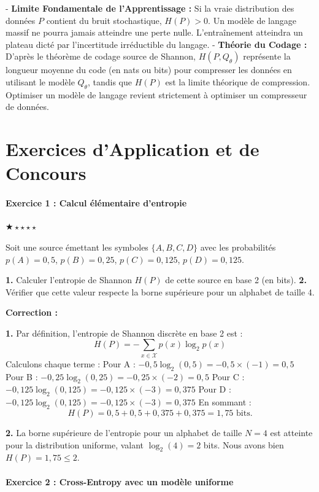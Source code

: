\documentclass[11pt,a4paper]{article}
\begin{document}
- \textbf{Limite Fondamentale de l'Apprentissage :} Si la vraie distribution des données $P$ contient du bruit stochastique, $H(P) > 0$. Un modèle de langage massif ne pourra jamais atteindre une perte nulle. L'entraînement atteindra un plateau dicté par l'incertitude irréductible du langage.
- \textbf{Théorie du Codage :} D'après le théorème de codage source de Shannon, $H(P, Q_\theta)$ représente la longueur moyenne du code (en nats ou bits) pour compresser les données en utilisant le modèle $Q_\theta$, tandis que $H(P)$ est la limite théorique de compression. Optimiser un modèle de langage revient strictement à optimiser un compresseur de données.



\newpage
\part{Exercices d'Application et de Concours}
\subsection*{Exercice 1 : Calcul élémentaire d'entropie }

$\bigstar\star\star\star\star$


Soit une source émettant les symboles $\{A, B, C, D\}$ avec les probabilités $p(A)=0,5$, $p(B)=0,25$, $p(C)=0,125$, $p(D)=0,125$.

\textbf{1.} Calculer l'entropie de Shannon $H(P)$ de cette source en base 2 (en bits).
\textbf{2.} Vérifier que cette valeur respecte la borne supérieure pour un alphabet de taille 4.

\textbf{Correction :}

\textbf{1.} Par définition, l'entropie de Shannon discrète en base 2 est :
$$H(P) = - \sum_{x \in \mathcal{X}} p(x) \log_2 p(x)$$
Calculons chaque terme :
Pour A : $-0,5 \log_2(0,5) = -0,5 \times (-1) = 0,5$
Pour B : $-0,25 \log_2(0,25) = -0,25 \times (-2) = 0,5$
Pour C : $-0,125 \log_2(0,125) = -0,125 \times (-3) = 0,375$
Pour D : $-0,125 \log_2(0,125) = -0,125 \times (-3) = 0,375$
En sommant :
$$H(P) = 0,5 + 0,5 + 0,375 + 0,375 = 1,75 \text{ bits}.$$

\textbf{2.} La borne supérieure de l'entropie pour un alphabet de taille $N=4$ est atteinte pour la distribution uniforme, valant $\log_2(4) = 2$ bits.
Nous avons bien $H(P) = 1,75 \le 2$.


\subsection*{Exercice 2 : Cross-Entropy avec un modèle uniforme }
\end{document}
